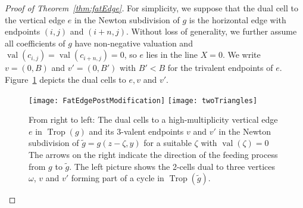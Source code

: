 \documentclass[11pt]{amsart}
\numberwithin{equation}{section}
\theoremstyle{plain}
\theoremstyle{definition}
\theoremstyle{remark}
\begin{document}
\begin{proof}[Proof of Theorem~\ref{thm:fatEdge}] 
  For simplicity, we suppose that the dual cell to the vertical edge $e$ in
  the Newton subdivision of $g$ is the horizontal edge with endpoints
  $(i,j)$ and $(i+n,j)$. Without loss of generality, we further assume all
  coefficients of $g$ have non-negative valuation and
  $\operatorname{val}(c_{i,j})=\operatorname{val}(c_{i+n,j})=0$, so $e$ lies in the line
  $X=0$. We write $v=(0,B)$ and $v'=(0,B')$ with $B'< B$ for the trivalent endpoints of $e$.  Figure~\ref{fig:twoTriangles} depicts the dual cells to $e, v$ and $v'$.

  \begin{figure}[tb]
    \centering
\texttt{[image: FatEdgePostModification]}
\qquad
    \texttt{[image: twoTriangles]}
    \caption{From right to left: The dual cells to a high-multiplicity
      vertical edge $e$ in $\operatorname{Trop}(g)$ and its 3-valent endpoints $v$ and
      $v'$ in the Newton subdivision of 
      $\tilde{g}=g(z-{\zeta},y)$ for a suitable ${\zeta}$ with $\operatorname{val}({\zeta})=0$ The arrows
      on the right indicate the direction of the feeding process from
      $g$ to $\tilde{g}$. The left picture shows the 2-cells dual to
      three vertices ${\omega}$, $v$ and $v'$ forming part of a cycle in
      $\operatorname{Trop}(\tilde{g})$.}
    \label{fig:twoTriangles}
  \end{figure}


\end{proof}
\end{document}
